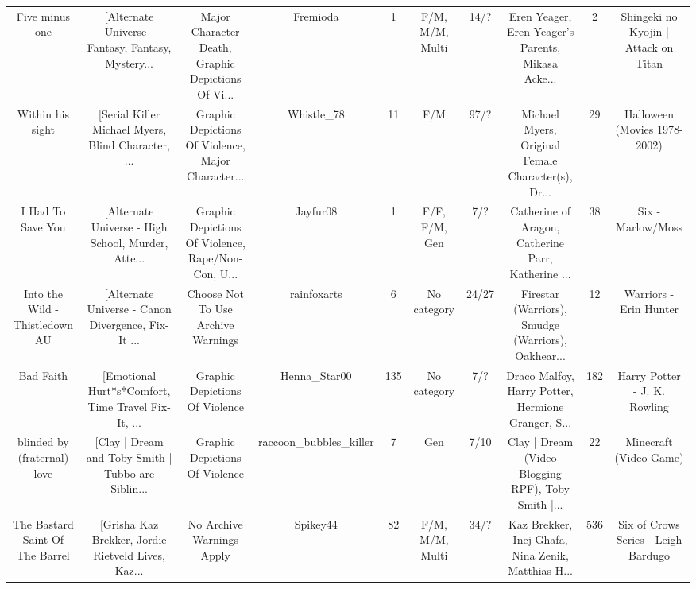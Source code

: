 \begin{table}[h!]
{\begin{tabular}{|c|c|c|c|c|c|c|c|c|c|}
                                    Five minus one & [Alternate Universe - Fantasy, Fantasy, Mystery... & Major Character Death, Graphic Depictions Of Vi... &                           Fremioda &         1 &                  F/M, M/M, Multi &     14/? & Eren Yeager, Eren Yeager's Parents, Mikasa Acke... &        2 &               Shingeki no Kyojin | Attack on Titan \\
                                  Within his sight & [Serial Killer Michael Myers, Blind Character, ... & Graphic Depictions Of Violence, Major Character... &                         Whistle\_78 &        11 &                              F/M &     97/? & Michael Myers, Original Female Character(s), Dr... &       29 &                       Halloween (Movies 1978-2002) \\
                                 I Had To Save You & [Alternate Universe - High School, Murder, Atte... & Graphic Depictions Of Violence, Rape/Non-Con, U... &                           Jayfur08 &         1 &                    F/F, F/M, Gen &      7/? & Catherine of Aragon, Catherine Parr, Katherine ... &       38 &                                  Six - Marlow/Moss \\
                    Into the Wild - Thistledown AU & [Alternate Universe - Canon Divergence, Fix-It ... &                 Choose Not To Use Archive Warnings &                        rainfoxarts &         6 &                      No category &    24/27 & Firestar (Warriors), Smudge (Warriors), Oakhear... &       12 &                             Warriors - Erin Hunter \\
                                         Bad Faith & [Emotional Hurt*s*Comfort, Time Travel Fix-It, ... &                     Graphic Depictions Of Violence &                       Henna\_Star00 &       135 &                      No category &      7/? & Draco Malfoy, Harry Potter, Hermione Granger, S... &      182 &                       Harry Potter - J. K. Rowling \\
                       blinded by (fraternal) love & [Clay | Dream and Toby Smith | Tubbo are Siblin... &                     Graphic Depictions Of Violence &             raccoon\_bubbles\_killer &         7 &                              Gen &     7/10 & Clay | Dream (Video Blogging RPF), Toby Smith |... &       22 &                             Minecraft (Video Game) \\
                   The Bastard Saint Of The Barrel & [Grisha Kaz Brekker, Jordie Rietveld Lives, Kaz... &                          No Archive Warnings Apply &                           Spikey44 &        82 &                  F/M, M/M, Multi &     34/? & Kaz Brekker, Inej Ghafa, Nina Zenik, Matthias H... &      536 &                Six of Crows Series - Leigh Bardugo \\

\end{tabular}}
\end{table}
